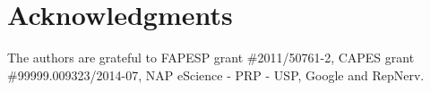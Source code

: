 \section{Acknowledgments}
The authors are grateful to FAPESP grant \#2011/50761-2, CAPES grant \#99999.009323/2014-07, NAP eScience - PRP - USP, Google and RepNerv.
